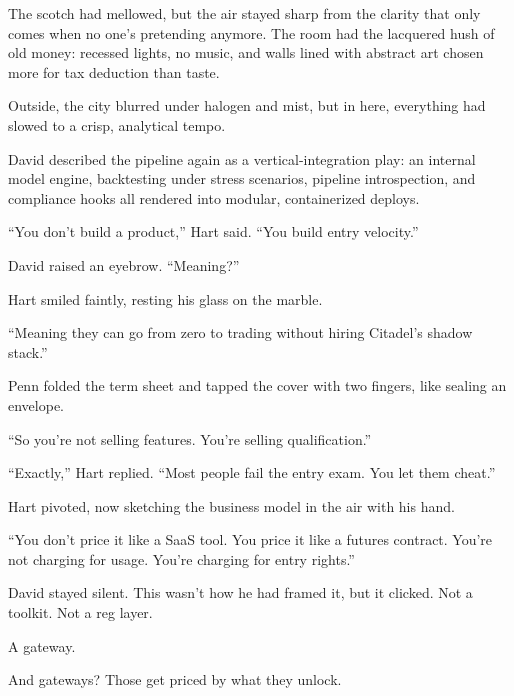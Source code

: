 \medskip

The scotch had mellowed, but the air stayed sharp from the clarity that only comes when no one’s 
pretending anymore. The room had the lacquered hush of old money: recessed lights, no music, and walls lined with abstract 
art chosen more for tax deduction than taste.

Outside, the city blurred under halogen and mist, but in here, everything had slowed to a crisp, analytical tempo.

David described the pipeline again as a vertical-integration play:  
an internal model engine, backtesting under stress scenarios, pipeline introspection, and compliance hooks all rendered 
into modular, containerized deploys.

``You don’t build a product,'' Hart said. ``You build entry velocity.''

David raised an eyebrow. ``Meaning?''

Hart smiled faintly, resting his glass on the marble.

``Meaning they can go from zero to trading without hiring Citadel’s shadow stack.''

Penn folded the term sheet and tapped the cover with two fingers, like sealing an envelope.

``So you’re not selling features. You’re selling qualification.''

``Exactly,'' Hart replied. ``Most people fail the entry exam. You let them cheat.''

Hart pivoted, now sketching the business model in the air with his hand.

``You don’t price it like a SaaS tool. You price it like a futures contract.  
You’re not charging for usage. You’re charging for entry rights.''

David stayed silent. This wasn’t how he had framed it, but it clicked.  
Not a toolkit. Not a reg layer.

A gateway.

And gateways? Those get priced by what they unlock.


